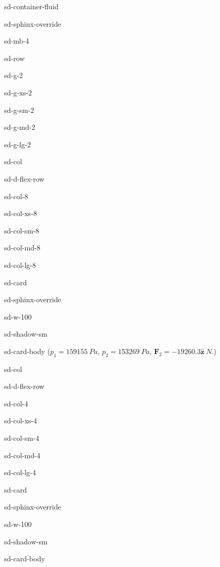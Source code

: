 \documentclass[letterpaper,10pt,italian]{jupyterBook}
\begin{document}
\begin{sphinxuseclass}{sd-container-fluid}
\begin{sphinxuseclass}{sd-sphinx-override}
\begin{sphinxuseclass}{sd-mb-4}
\begin{sphinxuseclass}{sd-row}
\begin{sphinxuseclass}{sd-g-2}
\begin{sphinxuseclass}{sd-g-xs-2}
\begin{sphinxuseclass}{sd-g-sm-2}
\begin{sphinxuseclass}{sd-g-md-2}
\begin{sphinxuseclass}{sd-g-lg-2}
\begin{sphinxuseclass}{sd-col}
\begin{sphinxuseclass}{sd-d-flex-row}
\begin{sphinxuseclass}{sd-col-8}
\begin{sphinxuseclass}{sd-col-xs-8}
\begin{sphinxuseclass}{sd-col-sm-8}
\begin{sphinxuseclass}{sd-col-md-8}
\begin{sphinxuseclass}{sd-col-lg-8}
\begin{sphinxuseclass}{sd-card}
\begin{sphinxuseclass}{sd-sphinx-override}
\begin{sphinxuseclass}{sd-w-100}
\begin{sphinxuseclass}{sd-shadow-sm}
\begin{sphinxuseclass}{sd-card-body}
\sphinxAtStartPar
(\(p_1=159155\ Pa\), \(p_2=153269\ Pa\), \(\mathbf{F}_2=-19260.3 \hat{\mathbf{z}}\ N\).)

\end{sphinxuseclass}
\end{sphinxuseclass}
\end{sphinxuseclass}
\end{sphinxuseclass}
\end{sphinxuseclass}
\end{sphinxuseclass}
\end{sphinxuseclass}
\end{sphinxuseclass}
\end{sphinxuseclass}
\end{sphinxuseclass}
\end{sphinxuseclass}
\end{sphinxuseclass}
\begin{sphinxuseclass}{sd-col}
\begin{sphinxuseclass}{sd-d-flex-row}
\begin{sphinxuseclass}{sd-col-4}
\begin{sphinxuseclass}{sd-col-xs-4}
\begin{sphinxuseclass}{sd-col-sm-4}
\begin{sphinxuseclass}{sd-col-md-4}
\begin{sphinxuseclass}{sd-col-lg-4}
\begin{sphinxuseclass}{sd-card}
\begin{sphinxuseclass}{sd-sphinx-override}
\begin{sphinxuseclass}{sd-w-100}
\begin{sphinxuseclass}{sd-shadow-sm}
\begin{sphinxuseclass}{sd-card-body}
\sphinxAtStartPar
{}


\end{sphinxuseclass}
\end{sphinxuseclass}
\end{sphinxuseclass}
\end{sphinxuseclass}
\end{sphinxuseclass}
\end{sphinxuseclass}
\end{sphinxuseclass}
\end{sphinxuseclass}
\end{sphinxuseclass}
\end{sphinxuseclass}
\end{sphinxuseclass}
\end{sphinxuseclass}
\end{sphinxuseclass}
\end{sphinxuseclass}
\end{sphinxuseclass}
\end{sphinxuseclass}
\end{sphinxuseclass}
\end{sphinxuseclass}
\end{sphinxuseclass}
\end{sphinxuseclass}
\end{sphinxuseclass}
\end{document}
